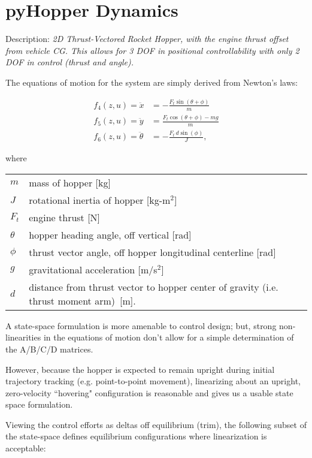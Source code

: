 \documentclass[12pt]{article}
\makeatletter
\newenvironment{conditions}
  {\par\vspace{\abovedisplayskip}\noindent\begin{tabular}{>{$}l<{$} @{${}={}$} l}}
  {\end{tabular}\par\vspace{\belowdisplayskip}}
\makeatother
\begin{document}
\section*{pyHopper Dynamics}
Description: \textit{{2D Thrust-Vectored Rocket Hopper, with the engine thrust offset from vehicle CG.  This allows for 3 DOF in positional controllability with only 2 DOF in control (thrust and angle).}}

\bigskip
\normalsize
The equations of motion for the system are simply derived from Newton's laws:

\begin{align*}
	f_4(z, u) = \ddot{x} &= -\frac{F_{t} \sin(\theta + \phi)}{m} \\
	f_5(z, u) = \ddot{y} &= \frac{F_{t} \cos(\theta + \phi) - mg}{m}\\
	f_6(z, u) = \ddot{\theta} &= -\frac{F_{t} \,d \sin(\phi)}{J},
\end{align*}

where

\begin{conditions}
m & mass of hopper [kg] \\
J & rotational inertia of hopper [kg-m$^2$] \\
F_{t} & engine thrust [N] \\
\theta & hopper heading angle, off vertical [rad] \\
\phi & thrust vector angle, off hopper longitudinal centerline [rad] \\
g & gravitational acceleration [m/s$^2$] \\
d & distance from thrust vector to hopper center of gravity (i.e. thrust moment arm) \,[m]. \\
\end{conditions}

\bigskip  A state-space formulation is more amenable to control design; but, strong non-linearities in the equations of motion don't allow for a simple determination of the A/B/C/D matrices.

\bigskip However, because the hopper is expected to remain upright during initial trajectory tracking (e.g. point-to-point movement), linearizing about an upright, zero-velocity ``hovering" configuration is reasonable and gives us a usable state space formulation.

\bigskip Viewing the control efforts as deltas off equilibrium (trim), the following subset of the state-space defines equilibrium configurations where linearization is acceptable:
\end{document}
